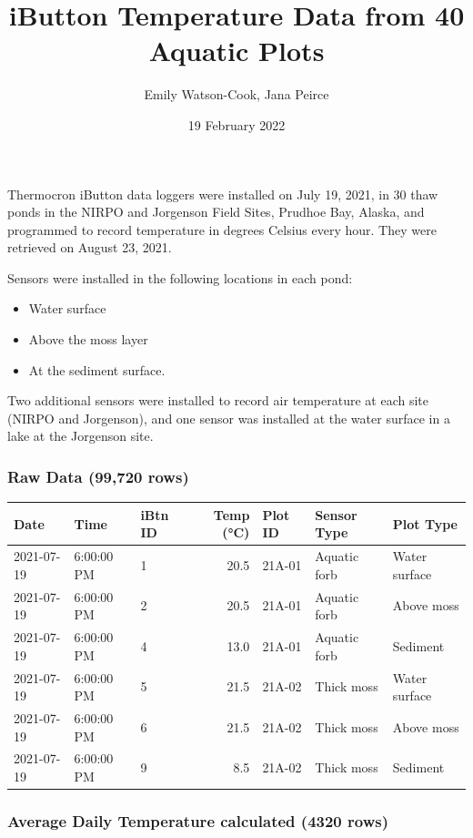 \documentclass[
]{article}
\title{iButton Temperature Data from 40 Aquatic Plots}
\author{Emily Watson-Cook, Jana Peirce}
\date{19 February 2022}
\providecommand{\tightlist}{%
  \setlength{\itemsep}{0pt}\setlength{\parskip}{0pt}}
\begin{document}
\maketitle

Thermocron iButton data loggers were installed on July 19, 2021, in 30
thaw ponds in the NIRPO and Jorgenson Field Sites, Prudhoe Bay, Alaska,
and programmed to record temperature in degrees Celsius every hour. They
were retrieved on August 23, 2021.

Sensors were installed in the following locations in each pond:

\begin{itemize}
\tightlist
\item
  Water surface
\item
  Above the moss layer
\item
  At the sediment surface.
\end{itemize}

Two additional sensors were installed to record air temperature at each
site (NIRPO and Jorgenson), and one sensor was installed at the water
surface in a lake at the Jorgenson site.

\hypertarget{raw-data-99720-rows}{%
\subsubsection{Raw Data (99,720 rows)}\label{raw-data-99720-rows}}

\begin{longtable}[]{@{}lllrlll@{}}
\toprule
Date & Time & iBtn ID & Temp (°C) & Plot ID & Sensor Type & Plot Type \\
\midrule
\endhead
2021-07-19 & 6:00:00 PM & 1 & 20.5 & 21A-01 & Aquatic forb & Water
surface \\
2021-07-19 & 6:00:00 PM & 2 & 20.5 & 21A-01 & Aquatic forb & Above
moss \\
2021-07-19 & 6:00:00 PM & 4 & 13.0 & 21A-01 & Aquatic forb & Sediment \\
2021-07-19 & 6:00:00 PM & 5 & 21.5 & 21A-02 & Thick moss & Water
surface \\
2021-07-19 & 6:00:00 PM & 6 & 21.5 & 21A-02 & Thick moss & Above moss \\
2021-07-19 & 6:00:00 PM & 9 & 8.5 & 21A-02 & Thick moss & Sediment \\
\bottomrule
\end{longtable}

\hypertarget{average-daily-temperature-calculated-4320-rows}{%
\subsubsection{Average Daily Temperature calculated (4320
rows)}\label{average-daily-temperature-calculated-4320-rows}}
\end{document}
